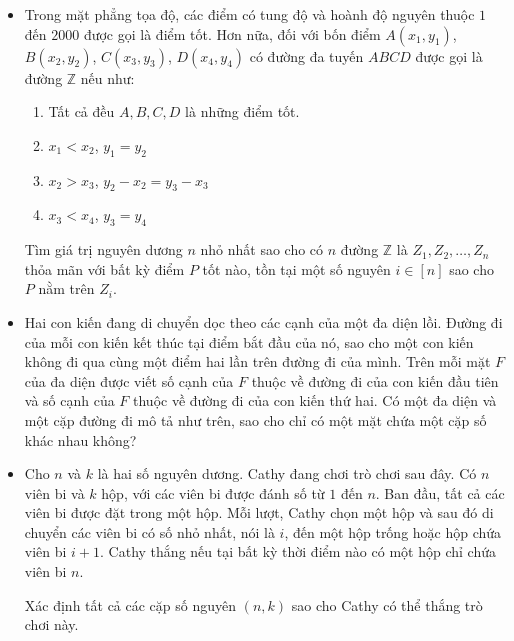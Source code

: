 \documentclass[11pt]{scrartcl}
\begin{document}
\begin{itemize}[label=, leftmargin=0em, itemsep=0.5em]
    \item \begin{btvn}
    Trong mặt phẳng tọa độ, các điểm có tung độ và hoành độ nguyên thuộc $1$ đến $2000$ được gọi là điểm tốt. Hơn nữa, đối với bốn điểm $A(x_1, y_1)$, $B(x_2, y_2)$, $C(x_3, y_3)$, $D(x_4, y_4)$ có đường đa tuyến $ABCD$ được gọi là đường $\mathbb{Z}$ nếu như:
    \begin{enumerate}
        \item Tất cả đều $A, B, C, D$ là những điểm tốt.
        \item  $x_1<x_2$, $y_1=y_2$
        \item $x_2>x_3$, $y_2-x_2=y_3-x_3$
        \item $x_3<x_4$, $y_3=y_4$
    \end{enumerate}
    
    Tìm giá trị nguyên dương $n$ nhỏ nhất sao cho có $n$ đường $\mathbb{Z}$ là $Z_1, Z_2,\dots, Z_n$ thỏa mãn với bất kỳ điểm $P$ tốt nào, tồn tại một số nguyên $i \in [n]$ sao cho $P$ nằm trên $Z_i$.
        
    \end{btvn}
   
    \item \begin{btvn}
        Hai con kiến đang di chuyển dọc theo các cạnh của một đa diện lồi. Đường đi của mỗi con kiến kết thúc tại điểm bắt đầu của nó, sao cho một con kiến không đi qua cùng một điểm hai lần trên đường đi của mình. Trên mỗi mặt $F$ của đa diện được viết số cạnh của $F$ thuộc về đường đi của con kiến đầu tiên và số cạnh của $F$ thuộc về đường đi của con kiến thứ hai. Có một đa diện và một cặp đường đi mô tả như trên, sao cho chỉ có một mặt chứa một cặp số khác nhau không?
    \end{btvn}
    \item \begin{btvn}
        Cho \( n \) và \( k \) là hai số nguyên dương. Cathy đang chơi trò chơi sau đây. Có \( n \) viên bi và \( k \) hộp, với các viên bi được đánh số từ \( 1 \) đến \( n \). Ban đầu, tất cả các viên bi được đặt trong một hộp. Mỗi lượt, Cathy chọn một hộp và sau đó di chuyển các viên bi có số nhỏ nhất, nói là \( i \), đến một hộp trống hoặc hộp chứa viên bi \( i+1 \). Cathy thắng nếu tại bất kỳ thời điểm nào có một hộp chỉ chứa viên bi \( n \).

        Xác định tất cả các cặp số nguyên \( (n,k) \) sao cho Cathy có thể thắng trò chơi này.


\end{btvn}
\end{itemize}
\end{document}
